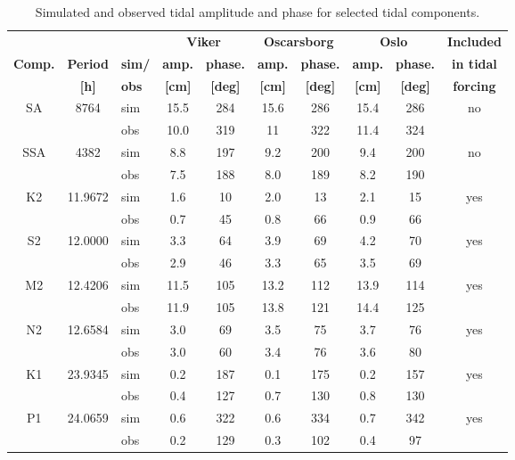 \begin{table}[ht] 
\caption{Simulated and observed tidal amplitude and phase for selected tidal components.} 
\label{tab:Tide} 
\centering 
\begin{tabular}{|c|c|l|cc|cc|cc|c|} 
\hline  
&&& \multicolumn{2}{|c|}{\bf Viker} & \multicolumn{2}{|c|}{\bf Oscarsborg} & \multicolumn{2}{|c|}{\bf Oslo} & {\bf Included} \\  
{\bf Comp.} & {\bf Period} &  {\bf sim/} & {\bf amp.} & {\bf phase.} & {\bf amp.} & {\bf phase.} & {\bf amp.} & {\bf phase.} & {\bf in tidal} \\ 
& {\bf [h]} & {\bf obs} & {\bf [cm]} & {\bf [deg]} & {\bf [cm]} & {\bf [deg]} & {\bf [cm]} & {\bf [deg]} & {\bf forcing} \\ \hline 
\small SA   & 8764	 	& sim & 15.5 & 284 & 15.6 & 286 & 15.4 & 286 & no   \\
\small      &        	& obs & 10.0 & 319 & 11 & 322 & 11.4 & 324 &    \\
\small SSA  & 4382 		& sim & 8.8 & 197 & 9.2 & 200 & 9.4 & 200 & no   \\
\small      &        	& obs & 7.5 & 188 & 8.0 & 189 & 8.2 & 190 &    \\
\small K2   & 11.9672 	& sim & 1.6 & 10 & 2.0 & 13 & 2.1 & 15 & yes  \\
\small      &        	& obs & 0.7 & 45 & 0.8 & 66 & 0.9 & 66 &    \\
\small S2   & 12.0000 	& sim & 3.3 & 64 & 3.9 & 69 & 4.2 & 70 & yes  \\
\small      &        	& obs & 2.9 & 46 & 3.3 & 65 & 3.5 & 69 &    \\
\small M2   & 12.4206 	& sim & 11.5 & 105 & 13.2 & 112 & 13.9 & 114 & yes  \\
\small      &        	& obs & 11.9 & 105 & 13.8 & 121 & 14.4 & 125 &    \\
\small N2   & 12.6584 	& sim & 3.0 & 69 & 3.5 & 75 & 3.7 & 76 & yes  \\
\small      &        	& obs & 3.0 & 60 & 3.4 & 76 & 3.6 & 80 &    \\
\small K1   & 23.9345 	& sim & 0.2 & 187 & 0.1 & 175 & 0.2 & 157 & yes  \\
\small      &        	& obs & 0.4 & 127 & 0.7 & 130 & 0.8 & 130 &    \\
\small P1   & 24.0659 	& sim & 0.6 & 322 & 0.6 & 334 & 0.7 & 342 & yes  \\
\small      &        	& obs & 0.2 & 129 & 0.3 & 102 & 0.4 & 97 &    \\

\end{tabular}
\end{table}
